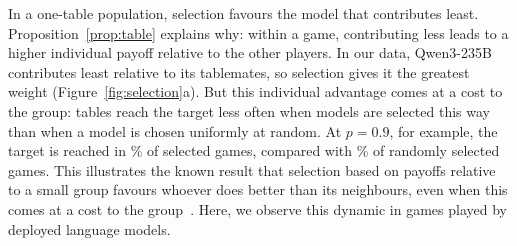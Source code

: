\documentclass[sigconf,anonymous]{aamas}
\begin{document}
In a one-table population, selection favours the model that contributes least. Proposition~\ref{prop:table} explains why: within a game, contributing less leads to a higher individual payoff relative to the other players. In our data, Qwen3-235B contributes least relative to its tablemates, so selection gives it the greatest weight (Figure~\ref{fig:selection}a). But this individual advantage comes at a cost to the group: tables reach the target less often when models are selected this way than when a model is chosen uniformly at random. At $p=0.9$, for example, the target is reached in \SelWithinReachHigh\% of selected games, compared with \SelUniformReachHigh\% of randomly selected games. This illustrates the known result that selection based on payoffs relative to a small group favours whoever does better than its neighbours, even when this comes at a cost to the group~\cite{schaffer1988evolutionarily}. Here, we observe this dynamic in games played by deployed language models.
\end{document}
